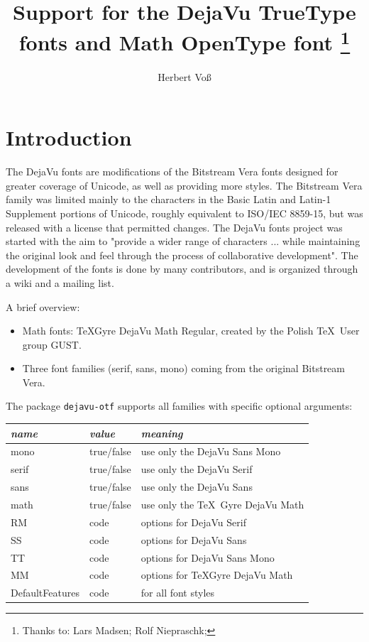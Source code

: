 \documentclass[11pt]{article}
\title{Support for the DejaVu TrueType fonts and Math OpenType font%
\thanks{Thanks to: Lars Madsen; Rolf Niepraschk;}}
\author{Herbert Voß}
\begin{document}
\maketitle
\tableofcontents

\section{Introduction}

The DejaVu fonts are modifications of the Bitstream Vera fonts designed for greater coverage of 
Unicode, as well as providing more styles. The Bitstream Vera family was limited mainly to the 
characters in the Basic Latin and Latin-1 Supplement portions of Unicode, roughly equivalent to 
ISO/IEC 8859-15, but was released with a license that permitted changes. The DejaVu fonts project 
was started with the aim to "provide a wider range of characters ... while maintaining the original 
look and feel through the process of collaborative development". The development of the fonts is 
done by many contributors, and is organized through a wiki and a mailing list.~\cite{dejavu}

A brief overview:

\begin{itemize}
\item Math fonts: TeXGyre DejaVu Math Regular, created by the Polish \TeX\ User group GUST.

\item Three font families (serif, sans, mono)  
coming from the original Bitstream Vera.

\end{itemize}

The package \texttt{dejavu-otf} supports all families with specific optional
arguments:

\begin{tabular}{@{} >{\ttfamily}l l l @{}}\\\toprule
\emph{name} & \emph{value} &\emph{meaning}\\\midrule
mono & true/false & use only the DejaVu Sans Mono\\
serif & true/false & use only the DejaVu Serif\\
sans & true/false & use only the DejaVu Sans\\
math & true/false & use only the \TeX\ Gyre DejaVu Math \\
RM & code & options for DejaVu Serif\\
SS & code &  options for DejaVu Sans\\
TT & code &  options for DejaVu Sans Mono\\
MM & code &  options for TeXGyre DejaVu Math\\
DefaultFeatures & code &  for all font styles\\\bottomrule
\end{tabular}
\end{document}
